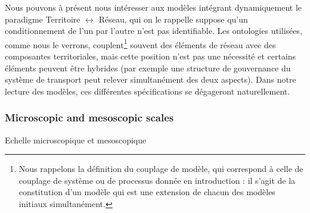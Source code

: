 Nous pouvons à présent nous intéresser aux modèles intégrant dynamiquement le paradigme Territoire $\leftrightarrow$ Réseau, qui on le rappelle suppose qu'un conditionnement de l'un par l'autre n'est pas identifiable. Les ontologies utilisées, comme nous le verrons, couplent\footnote{Nous rappelons la définition du couplage de modèle, qui correspond à celle de couplage de système ou de processus donnée en introduction : il s'agit de la constitution d'un modèle qui est une extension de chacun des modèles initiaux simultanément.} souvent des éléments de réseau avec des composantes territoriales, mais cette position n'est pas une nécessité et certains éléments peuvent être hybrides (par exemple une structure de gouvernance du système de transport peut relever simultanément des deux aspects). Dans notre lecture des modèles, ces différentes spécifications se dégageront naturellement.







\subsubsection{Microscopic and mesoscopic scales}{Echelle microscopique et mesoscopique}




